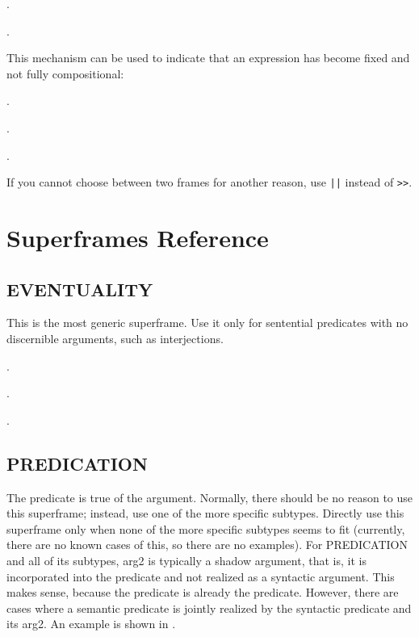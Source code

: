 \documentclass[a4paper]{article}
\newcommand{\fr}[1]{\textsf{#1}}
\newcommand{\rl}[1]{\textsf{#1}}
\begin{document}
\ex.

\ex.

This mechanism can be used to indicate that an expression has become fixed and
not fully compositional:

\ex.

\ex.

\ex.

If you cannot choose between two frames for another reason, use \texttt{||} instead of \texttt{>}\texttt{>}.

\newpage\section{Superframes Reference}

\subsection{ \fr{EVENTUALITY}}
\label{sec:EVENTUALITY}

This is the most generic superframe. Use it only for sentential predicates with
no discernible arguments, such as interjections.

\ex.

\ex.

\ex.

\newpage\subsection{ \fr{PREDICATION}}
\label{sec:PREDICATION}

The \rl{predicate} is true of the \rl{argument}. Normally, there should be no
reason to use this superframe; instead, use one of the more specific subtypes.
Directly use this superframe only when none of the more specific subtypes seems
to fit (currently, there are no known cases of this, so there are no examples).
For \fr{PREDICATION} and all of its subtypes, arg2 is typically a shadow
argument, that is, it is incorporated into the predicate and not realized as a
syntactic argument. This makes sense, because the predicate is already the
predicate. However, there are cases where a semantic predicate is jointly
realized by the syntactic predicate and its arg2. An example is shown in \Next.
\end{document}
